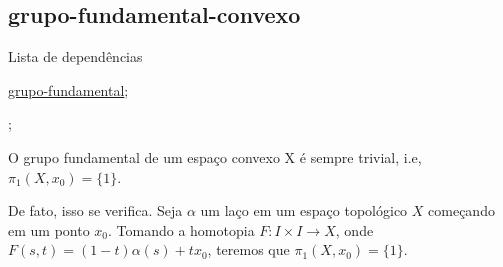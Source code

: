 \subsection{grupo-fundamental-convexo}
\label{grupo-fundamental-convexo}
\begin{titlemize}{Lista de dependências}
	\item \hyperref[grupo-fundamental-def]{grupo-fundamental};\\ %
	\item \hyperref[]{};\\
\end{titlemize}

\begin{ex}
O grupo fundamental de um espaço convexo X é sempre trivial, i.e, $\pi_1(X, x_0) = \{ 1\}$.
\end{ex}

De fato, isso se verifica. Seja $\alpha$ um laço em um espaço topológico $X$ começando em um ponto $x_0$.
Tomando a homotopia $F:I \times I \longrightarrow X$, onde $F(s,t) = (1 - t)\alpha(s) + tx_0$, teremos que $\pi_1(X, x_0) = \{1\}$.


